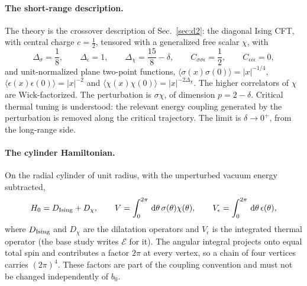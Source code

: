 \documentclass[11pt,a4paper]{article}
\numberwithin{equation}{section}
\newcommand{\dd}{\,\mathrm d}
\begin{document}
\paragraph{The short-range description.} The theory is the crossover description of Sec.~\ref{sec:d2}: the diagonal
Ising CFT, with central charge $c=\frac12$, tensored with a generalized free scalar $\chi$, with
\begin{equation}
 \Delta_\sigma=\frac18,\qquad \Delta_\epsilon=1,\qquad \Delta_\chi=\frac{15}{8}-\delta,\qquad
 C_{\sigma\sigma\epsilon}=\frac12,\qquad C_{\epsilon\epsilon\epsilon}=0,
\end{equation}
and unit-normalized plane two-point functions,
$\langle\sigma(x)\sigma(0)\rangle=|x|^{-1/4}$, $\langle\epsilon(x)\epsilon(0)\rangle=|x|^{-2}$ and
$\langle\chi(x)\chi(0)\rangle=|x|^{-2\Delta_\chi}$. The higher correlators of $\chi$ are Wick-factorized. The
perturbation is $\sigma\chi$, of dimension $p=2-\delta$. Critical thermal tuning is understood: the relevant energy
coupling generated by the perturbation is removed along the critical trajectory. The limit is $\delta\to0^+$, from the
long-range side.

\paragraph{The cylinder Hamiltonian.} On the radial cylinder of unit radius, with the unperturbed vacuum energy
subtracted,
\begin{equation}
 H_0=D_{\rm Ising}+D_\chi,\qquad V=\int_0^{2\pi}\dd\theta\,\sigma(\theta)\chi(\theta),\qquad
 V_\epsilon=\int_0^{2\pi}\dd\theta\,\epsilon(\theta),
 \label{eq:cyl:H0}
\end{equation}
where $D_{\rm Ising}$ and $D_\chi$ are the dilatation operators and $V_\epsilon$ is the integrated thermal operator
(the base study writes $\mathcal E$ for it). The angular integral projects onto equal total spin and contributes a
factor $2\pi$ at every vertex, so a chain of four vertices carries $(2\pi)^4$. These factors are part of the coupling
convention and must not be changed independently of $b_0$.
\end{document}

